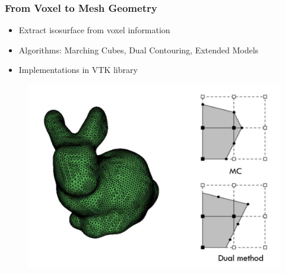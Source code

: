 \begin{frame}

	\frametitle{From Voxel to Mesh Geometry}
	\begin{minipage}{0.85\textwidth}
		\begin{itemize}
		\item Extract isosurface from voxel information
		\item Algorithms: Marching Cubes, Dual Contouring, Extended Models
		\item Implementations in VTK library
		\end{itemize}
		\begin{figure}
		\includegraphics[scale=0.35]{Pictures/bunny_MC.pdf}
		\end{figure}
	\end{minipage}
	\begin{minipage}{0.14\textwidth}
		\begin{figure}
					\\

\end{figure}
\end{minipage}
\end{frame}
